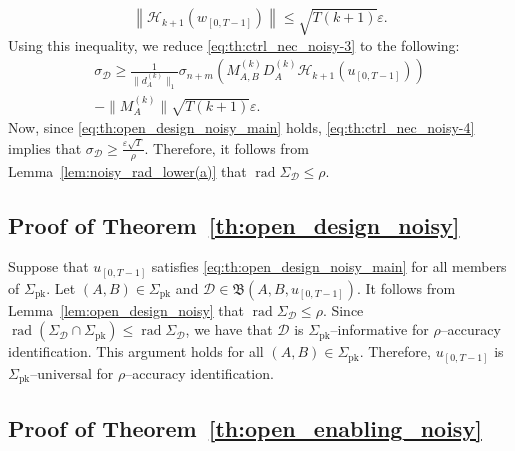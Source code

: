 \documentclass[journal,twoside,web]{ieeecolor}
\DeclareMathOperator{\rad}{rad}
\newcommand{\norm}[1]{\left\|#1\right\|}
\begin{document}
\begin{equation}
\norm{\mathcal{H}_{k+1}(w_{[0,T-1]})}\leq \sqrt{T(k+1)}\varepsilon.
\end{equation}
Using this inequality, we reduce \eqref{eq:th:ctrl_nec_noisy-3} to the following:
\begin{equation}
\label{eq:th:ctrl_nec_noisy-4}
\begin{split}
\sigma_\mathcal{D}\geq\tfrac{1}{\|d_A^{(k)}\|_1}\sigma_{n+m}(M_{A,B}^{(k)}D_A^{(k)}\mathcal{H}_{k+1}(u_{[0,T-1]})) \\
-\|M_{A}^{(k)}\|\sqrt{T(k+1)}\varepsilon.
\end{split}
\end{equation}
Now, since \eqref{eq:th:open_design_noisy_main} holds, \eqref{eq:th:ctrl_nec_noisy-4} implies that $\sigma_\mathcal{D}\geq \frac{\varepsilon\sqrt{T}}{\rho}$. Therefore, it follows from Lemma~\ref{lem:noisy_rad_lower(a)} that $\rad\Sigma_\mathcal{D}\leq \rho$.  \hfill \QED 

\subsection{Proof of Theorem~\ref{th:open_design_noisy}}

Suppose that $u_{[0,T-1]}$ satisfies \eqref{eq:th:open_design_noisy_main} for all members of $\Sigma_\text{pk}$. Let $(A,B)\in\Sigma_\text{pk}$ and $\mathcal{D}\in\mathfrak{B}(A,B,u_{[0,T-1]})$. It follows from Lemma~\ref{lem:open_design_noisy} that $\rad\Sigma_\mathcal{D}\leq\rho$. Since \mbox{$\rad(\Sigma_\mathcal{D}\cap\Sigma_\text{pk})\leq \rad\Sigma_\mathcal{D}$}, we have that $\mathcal{D}$ is $\Sigma_\text{pk}$--informative for $\rho$--accuracy identification. This argument holds for all $(A,B)\in\Sigma_\text{pk}$. Therefore, $u_{[0,T-1]}$ is $\Sigma_\text{pk}$--universal for $\rho$--accuracy identification. \hfill \QED

\subsection{Proof of Theorem~\ref{th:open_enabling_noisy}}
\label{app:I}
\end{document}
